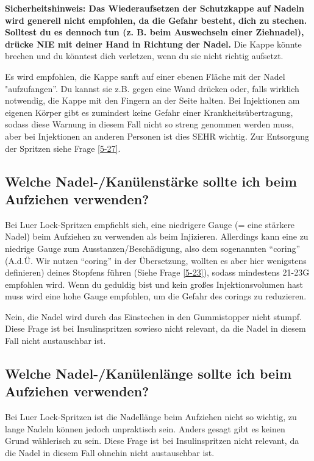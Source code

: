 \documentclass{article}
\begin{document}
\textbf{Sicherheitshinweis: Das Wiederaufsetzen der Schutzkappe auf Nadeln wird generell nicht empfohlen, da die Gefahr besteht, dich zu stechen. Solltest du es dennoch tun (z. B. beim Auswechseln einer Ziehnadel), drücke NIE mit deiner Hand in Richtung der Nadel.} Die Kappe könnte brechen und du könntest dich verletzen, wenn du sie nicht richtig aufsetzt. 

Es wird empfohlen, die Kappe sanft auf einer ebenen Fläche mit der Nadel "aufzufangen”. Du kannst sie z.B. gegen eine Wand drücken oder, falls wirklich notwendig, die Kappe mit den Fingern an der Seite halten. Bei Injektionen am eigenen Körper gibt es zumindest keine Gefahr einer Krankheitsübertragung, sodass diese Warnung in diesem Fall nicht so streng genommen werden muss, aber bei Injektionen an anderen Personen ist dies SEHR wichtig. Zur Entsorgung der Spritzen siehe Frage \ref{5-27}.

\subsection{Welche Nadel-/Kanülenstärke sollte ich beim Aufziehen verwenden?}

Bei Luer Lock-Spritzen empfiehlt sich, eine niedrigere Gauge (= eine stärkere Nadel) beim Aufziehen zu verwenden als beim Injizieren. Allerdings kann eine zu niedrige Gauge zum Ausstanzen/Beschädigung, also dem sogenannten “coring” (A.d.Ü. Wir nutzen “coring” in der Übersetzung, wollten es aber hier wenigstens definieren) deines Stopfens führen (Siehe Frage \ref{5-23}), sodass mindestens 21-23G empfohlen wird. Wenn du geduldig bist und kein großes Injektionsvolumen hast muss wird eine hohe Gauge empfohlen, um die Gefahr des corings zu reduzieren. 

Nein, die Nadel wird durch das Einstechen in den Gummistopper nicht stumpf. Diese Frage ist bei Insulinspritzen sowieso nicht relevant, da die Nadel in diesem Fall nicht austauschbar ist.

\subsection{Welche Nadel-/Kanülenlänge sollte ich beim Aufziehen verwenden?}

Bei Luer Lock-Spritzen ist die Nadellänge beim Aufziehen nicht so wichtig, zu lange Nadeln können jedoch unpraktisch sein. Anders gesagt gibt es keinen Grund wählerisch zu sein. Diese Frage ist bei Insulinspritzen nicht relevant, da die Nadel in diesem Fall ohnehin nicht austauschbar ist.
\end{document}
